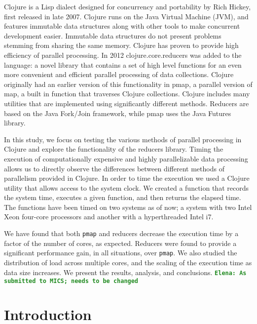 \documentclass[12pt]{article}
\newcommand{\comment}[1]{{\bf \tt  {#1}}}
\newcommand{\emcomment}[1]{\textcolor{ForestGreen}{\comment{Elena: {#1}}}}
\newcommand{\clocode}[1]{{\texttt {#1}}}
\begin{document}
Clojure is a Lisp dialect designed for concurrency and portability by Rich Hickey, first released in late 2007. Clojure runs on the Java Virtual Machine (JVM), and features immutable data structures along with other tools to make concurrent development easier. Immutable data structures do not present problems stemming from sharing the same memory. Clojure has proven to provide high efficiency of parallel processing. In 2012 clojure.core.reducers was added to the language: a novel library that contains a set of high level functions for an even more convenient and efficient parallel processing of data collections. Clojure originally had an earlier version of this functionality in pmap, a parallel version of map, a built in function that traverses Clojure collections. Clojure includes many utilities that are implemented using significantly different methods. Reducers are based on the Java Fork/Join framework, while pmap uses the Java Futures library.


In this study, we focus on testing the various methods of parallel processing in Clojure and explore the functionality of the reducers library. Timing the execution of computationally expensive and highly parallelizable data processing allows us to directly observe the differences between different methods of parallelism provided in Clojure. In order to time the execution we used a Clojure utility that allows access to the system clock. We created a function that records the system time, executes a given function, and then returns the elapsed time. The functions have been timed on two systems as of now; a system with two Intel Xeon four-core processors and another with a hyperthreaded Intel i7.


We have found that both \clocode{pmap} and reducers decrease the execution time by a factor of the number of cores, as expected. Reducers were found to provide a significant performance gain, in all situations, over \clocode{pmap}. We also studied the distribution of load across multiple cores, and the scaling of the execution time as data size increases. We present the results, analysis, and conclusions.
\emcomment{As submitted to MICS; needs to be changed}


 \newpage
\setcounter{page}{1}


\section{Introduction}\label{sec:intro}
\end{document}
